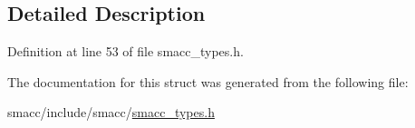 \subsection{Detailed Description}


Definition at line 53 of file smacc\+\_\+types.\+h.



The documentation for this struct was generated from the following file\+:\begin{DoxyCompactItemize}
\item 
smacc/include/smacc/\hyperlink{smacc__types_8h}{smacc\+\_\+types.\+h}\end{DoxyCompactItemize}
